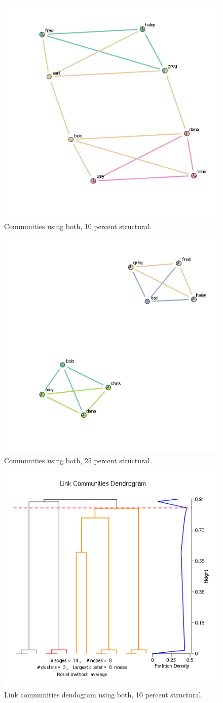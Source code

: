 \documentclass{report}
\begin{document}
\begin{figure}[htp!]
  \centering
  \includegraphics[width=0.65\linewidth]{toy2/ea/edge_comm_0.1.png}
  \caption{Communities using both, 10 percent structural.}
\end{figure}

\begin{figure}[htp!]
  \centering
  \includegraphics[width=0.65\linewidth]{toy2/ea/edge_comm_0.25.png}
  \caption{Communities using both, 25 percent structural.}
\end{figure}

\begin{figure}[htp!]
  \centering
  \includegraphics[width=0.65\linewidth]{toy2/ea/lc_0.1.png}
  \caption{Link communities dendogram using both, 10 percent structural.}
\end{figure}
\end{document}
